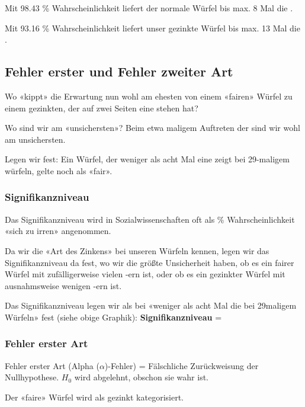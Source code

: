 Mit 98.43 \% Wahrscheinlichkeit liefert der normale Würfel bis max. 8 Mal die .

Mit 93.16 \% Wahrscheinlichkeit liefert unser gezinkte  Würfel bis
max. 13 Mal die . 

\newpage


\subsection{Fehler erster und Fehler zweiter Art}
Wo «kippt» die Erwartung nun wohl am ehesten von einem «fairen» Würfel
zu einem gezinkten, der auf zwei Seiten eine  stehen hat?

Wo sind wir am «unsichersten»?
Beim etwa  maligem Auftreten der  sind wir
wohl am unsichersten.

Legen wir fest: Ein Würfel, der weniger als acht Mal
eine  zeigt bei 29-maligem würfeln, gelte noch als «fair».

\subsubsection{Signifikanzniveau}
Das Signifikanzniveau wird in Sozialwissenschaften oft als  \%
Wahrscheinlichkeit «sich zu irren» angenommen.

Da wir die «Art des Zinkens» bei unseren Würfeln kennen, legen wir das
Signifikanzniveau da fest, wo wir die größte Unsicherheit haben, ob
es ein fairer Würfel mit zufälligerweise vielen -ern ist,
oder ob es ein gezinkter Würfel mit ausnahmsweise wenigen
-ern ist.

Das Signifikanzniveau legen wir als bei «weniger als acht Mal die
 bei 29maligem Würfeln» fest (siehe obige Graphik):
\vspace{15mm}
\textbf{Signifikanzniveau} = 


\subsubsection{Fehler erster Art}
Fehler erster Art (Alpha ($\alpha$)-Fehler) = Fälschliche
Zurückweisung der Nullhypothese. $H_0$ wird abgelehnt, obschon sie
wahr ist. 

Der «faire» Würfel wird als gezinkt kategorisiert.

